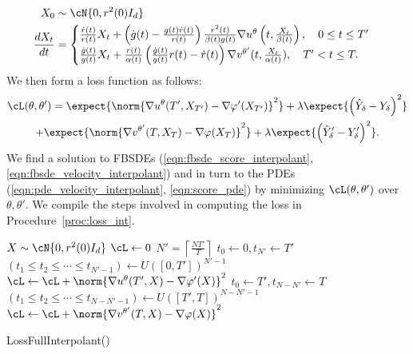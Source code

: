 \begin{align*}
    X_0 &\sim\cN{0,r^2(0)I_d}\\
    \frac{dX_t}{dt} &= \begin{cases}
        \frac{\dot r(t)}{r(t)}X_t+\left(\dot g(t)-\frac{g(t)\dot r(t)}{r(t)}\right)\frac{r^2(t)}{\beta(t)g(t)}\nabla u^\theta\left(t,\frac{X_t}{\beta(t)}\right),\quad 0\le t\le T'\\
        \frac{\dot g(t)}{g(t)}X_t+\frac{r(t)}{\alpha(t)}\left(\frac{\dot g(t)}{g(t)}r(t)-\dot r(t)\right)\nabla v^{\theta'}(t,\frac{X_t}{\alpha(t)}),\quad T'<t\le T.
    \end{cases}
\end{align*}
We then form a loss function as follows:
\begin{multline}
\cL(\theta,\theta') = \expect{ \norm{\nabla u^\theta(T',X_{T'})-\nabla\varphi'(X_{T'})}^2}+\lambda\expect{\left(\hat{Y}_{\delta}-Y_{\delta}\right)^2}\\
+\expect{ \norm{\nabla v^{\theta'}(T,X_{T})-\nabla\varphi(X_{T})}^2}+\lambda\expect{\left(\hat{Y}'_{\delta}-Y'_{\delta}\right)^2}.%
\end{multline}
We find a solution to FBSDEs (\ref{eqn:fbsde_score_interpolant},\ref{eqn:fbsde_velocity_interpolant}) and in turn to the PDEs (\ref{eqn:pde_velocity_interpolant}, \ref{eqn:score_pde}) by minimizing $\cL(\theta,\theta')$ over $\theta, \theta'$. We compile the steps involved in computing the loss in Procedure~\ref{proc:loss_int}.
\begin{procedure}
\DontPrintSemicolon
	\KwOut{$\cL$}
 $X\sim\cN{0,r^2(0)I_d}$\;
$\cL \gets 0$\;
$N' = \left\lceil \frac{NT'}{T}\right\rceil$\;
$t_0 \gets 0, t_{N'} \gets T'$\;
$(t_1\le t_2\le\cdots\le t_{N'-1}) \gets U([0,T'])^{N'-1}$\;
$\cL\gets \cL + \norm{\nabla u^\theta(T',X)-\nabla\varphi'(X)}^2$\;
$t_0 \gets T', t_{N-N'} \gets T$\;
$(t_1\le t_2\le\cdots\le t_{N-N'-1}) \gets U([T',T])^{N-N'-1}$\;
$\cL\gets \cL + \norm{\nabla v^{\theta'}(T,X)-\nabla\varphi(X)}^2$\;
\Return{$\cL$}
\caption{LossFullInterpolant()}\label{proc:loss_int}
\end{procedure}

